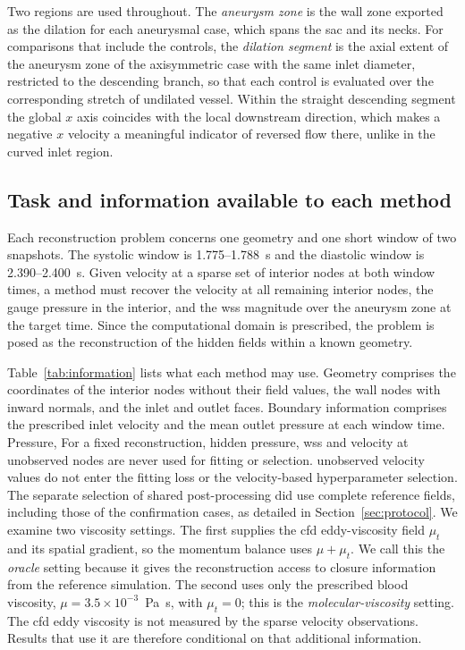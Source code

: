 \documentclass[12pt,a4paper]{article}
\newcommand{\cfdrevision}[1]{#1} %
\newcommand{\CFD}{\ac{cfd}\xspace}
\newcommand{\WSS}{\ac{wss}\xspace}
\theoremstyle{definition}
\numberwithin{equation}{section}
\providecommand{\DIFaddtex}[1]{{\protect\color{blue} \sf #1}} %
\providecommand{\DIFdeltex}[1]{{\protect\color{red} \scriptsize #1}} %
\providecommand{\DIFaddbegin}{} %
\providecommand{\DIFaddend}{} %
\providecommand{\DIFdelbegin}{} %
\providecommand{\DIFdelend}{} %
\providecommand{\DIFadd}[1]{\texorpdfstring{\DIFaddtex{#1}}{#1}} %
\providecommand{\DIFdel}[1]{\texorpdfstring{\DIFdeltex{#1}}{}} %
\newcommand{\DIFscaledelfig}{0.5}
\newlength{\DIFdelgraphicswidth} %
\newlength{\DIFdelgraphicsheight} %
\newcommand{\DIFaddincludegraphics}[2][]{{\color{blue}\fbox{\DIFOincludegraphics[#1]{#2}}}} %
\newcommand{\DIFdelincludegraphics}[2][]{%
\sbox{\DIFdelgraphicsbox}{\DIFOincludegraphics[#1]{#2}}%
\settoboxwidth{\DIFdelgraphicswidth}{\DIFdelgraphicsbox} %
\settoboxtotalheight{\DIFdelgraphicsheight}{\DIFdelgraphicsbox} %
\scalebox{\DIFscaledelfig}{%
\parbox[b]{\DIFdelgraphicswidth}{\usebox{\DIFdelgraphicsbox}\\[-\baselineskip] \rule{\DIFdelgraphicswidth}{0em}}\llap{\resizebox{\DIFdelgraphicswidth}{\DIFdelgraphicsheight}{%
\setlength{\unitlength}{\DIFdelgraphicswidth}%
\begin{picture}(1,1)%
\thicklines\linethickness{2pt} %
{\color[rgb]{1,0,0}\put(0,0){\framebox(1,1){}}}%
{\color[rgb]{1,0,0}\put(0,0){\line( 1,1){1}}}%
{\color[rgb]{1,0,0}\put(0,1){\line(1,-1){1}}}%
\end{picture}%
}\hspace*{3pt}}} %
} %
\DeclareRobustCommand{\DIFaddbegin}{\DIFOaddbegin \let\includegraphics\DIFaddincludegraphics} %
\DeclareRobustCommand{\DIFaddend}{\DIFOaddend \let\includegraphics\DIFOincludegraphics} %
\DeclareRobustCommand{\DIFdelbegin}{\DIFOdelbegin \let\includegraphics\DIFdelincludegraphics} %
\DeclareRobustCommand{\DIFdelend}{\DIFOaddend \let\includegraphics\DIFOincludegraphics} %
\begin{document}
Two regions are used throughout. The \emph{aneurysm zone} is the wall zone exported as the dilation for each aneurysmal case, which spans the sac and its necks. For comparisons that include the controls, the \emph{dilation segment} is the axial extent of the aneurysm zone of the axisymmetric case with the same inlet diameter, restricted to the descending branch, so that each control is evaluated over the corresponding stretch of undilated vessel. Within the straight descending segment the global $x$ axis coincides with the local downstream direction, which makes a negative $x$ velocity a meaningful indicator of reversed flow there, unlike in the curved inlet region.


\subsection{Task and information available to each method}
\label{sec:task}
Each reconstruction problem concerns one geometry and one short window of two snapshots. %
The systolic window is 1.775--1.788~s and the diastolic window is 2.390--2.400~s. Given velocity at a sparse set of interior nodes at both window times, a method must recover the velocity at all remaining interior nodes, the gauge pressure in the interior, and the \WSS magnitude over the aneurysm zone at the target time. Since the computational domain is prescribed, the problem is posed as the reconstruction of the hidden fields within a known geometry.

Table~\ref{tab:information} lists what each method may use. Geometry comprises the coordinates of the interior nodes without their field values, the wall nodes with inward normals, and the inlet and outlet faces. Boundary information comprises the prescribed inlet velocity and the mean outlet pressure at each window time. \DIFdelbegin \DIFdel{Pressure, }\DIFdelend \DIFaddbegin \DIFadd{For a fixed reconstruction, hidden pressure, }\DIFaddend \WSS and \DIFdelbegin \DIFdel{velocity at unobserved nodes are never used for fitting or selection. }\DIFdelend \DIFaddbegin \DIFadd{unobserved velocity values do not enter the fitting loss or the velocity-based hyperparameter selection. \cfdrevision{The separate selection of shared post-processing did use complete reference fields, including those of the confirmation cases, as detailed in Section~\ref{sec:protocol}.} }\DIFaddend We examine two viscosity settings. The first supplies the \CFD eddy-viscosity field $\mu_t$ and its spatial gradient, so the momentum balance uses $\mu+\mu_t$. We call this the \emph{oracle} setting because it gives the reconstruction access to closure information from the reference simulation. The second uses only the prescribed blood viscosity, $\mu=3.5\times10^{-3}$~Pa~s, with $\mu_t=0$; this is the \emph{molecular-viscosity} setting. The \CFD eddy viscosity is not measured by the sparse velocity observations. Results that use it are therefore conditional on that additional information.
\end{document}

